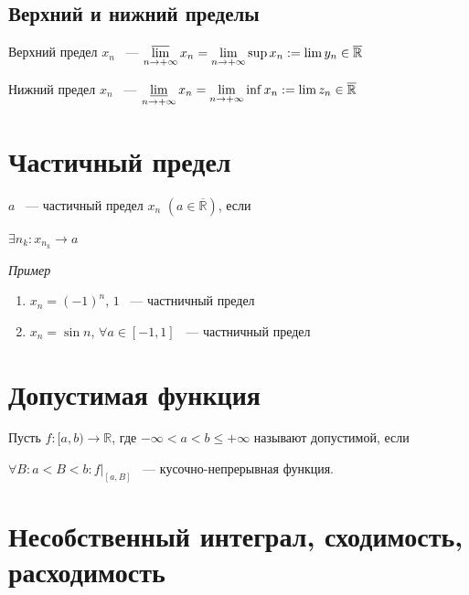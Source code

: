 \documentclass{article}
\begin{document}
        \subsection{Верхний и нижний пределы}
        
            Верхний предел $x_n$ ~--- $\varlimsup\limits_{n \rightarrow +\infty} x_n = \lim\limits_{n \rightarrow +\infty} \sup x_n := \lim y_n \in \mathbb{\overline{R}}$
            
            Нижний предел $x_n$ ~--- $\varliminf\limits_{n \rightarrow +\infty} x_n = \lim\limits_{n \rightarrow +\infty} \inf x_n := \lim z_n \in \mathbb{\overline{R}}$
            
        
    \newpage
    
    \section{Частичный предел}
    
        $a$ ~--- частичный предел $x_n$ $(a \in \overline{\mathbb{R}})$, если
        
        $\exists n_k : x_{n_k} \rightarrow a$
        
        \textit{Пример}
        
        \begin{enumerate}
        
            \item $x_n = (-1)^n$, $1$ ~--- частничный предел
            
            \item $x_n = \sin{n}$, $\forall a \in [-1, 1]$ ~--- частничный предел
            
        \end{enumerate}
        
    \newpage
    
    \section{Допустимая функция}
    
        Пусть $f : [a, b) \rightarrow \mathbb{R}$, где $-\infty < a < b \leq +\infty$ называют допустимой, если
        
        $\forall B : a < B < b : f\big|_{[a{,} B]}$ ~--- кусочно-непрерывная функция.
        
    \newpage
    
    \section{Несобственный интеграл, сходимость, расходимость}
    
\end{document}
